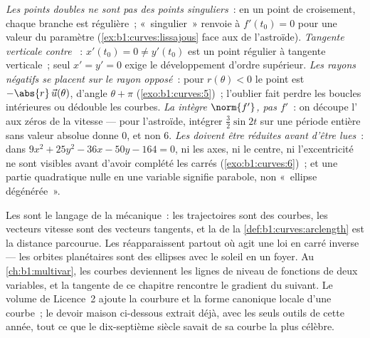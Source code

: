 \begin{remark}
\label{rem:b1:curves:pitfalls}
\emph{Les points doubles ne sont pas des points singuliers}~: en un
point de croisement, chaque branche est régulière~; «~singulier~» renvoie à
$f'(t_0) = 0$ pour une valeur du paramètre
(\cref{ex:b1:curves:lissajous} face aux  de l'astroïde).
\emph{Tangente verticale contre }~: $x'(t_0) = 0 \neq y'(t_0)$
est un point régulier à tangente verticale~; seul $x' = y' = 0$
exige le développement d'ordre supérieur.
\emph{Les rayons négatifs se placent sur le rayon opposé}~: pour $r(\theta) <
0$ le point est $-\abs{r}\,\vec u(\theta)$, d'angle $\theta +
\pi$ (\cref{exo:b1:curves:5})~; l'oublier fait perdre les boucles intérieures
ou dédouble les courbes.
\emph{La  intègre $\norm{f'}$, pas $f'$}~: on découpe
l' aux zéros de la vitesse --- pour l'astroïde,
intégrer $\frac32\sin 2t$ sur une période entière sans valeur
absolue donne $0$, et non $6$.
\emph{Les  doivent être réduites avant d'être lues}~: dans $9x^2 +
25y^2 - 36x - 50y - 164 = 0$, ni les axes, ni le centre,
ni l'excentricité ne sont visibles avant d'avoir complété les carrés
(\cref{exo:b1:curves:6})~; et une partie quadratique nulle en une
variable signifie parabole, non «~ellipse dégénérée~».
\end{remark}

\begin{remark}
\label{rem:b1:curves:whereused}
Les  sont le langage de la mécanique~: les trajectoires
sont des courbes, les vecteurs vitesse sont des vecteurs tangents, et la
 de la \cref{def:b1:curves:arclength} est la distance parcourue. Les
 réapparaissent partout où agit une loi en carré inverse --- les
orbites planétaires sont des ellipses avec le soleil en un foyer. Au
\cref{ch:b1:multivar}, les courbes deviennent les lignes de niveau de fonctions
de deux variables, et la tangente de ce chapitre rencontre le
gradient du suivant. Le volume de Licence~2 ajoute la courbure et la
forme canonique locale d'une courbe~; le devoir maison ci-dessous
extrait déjà, avec les seuls outils de cette année, tout ce que le
dix-septième siècle savait de sa courbe la plus célèbre.
\end{remark}

